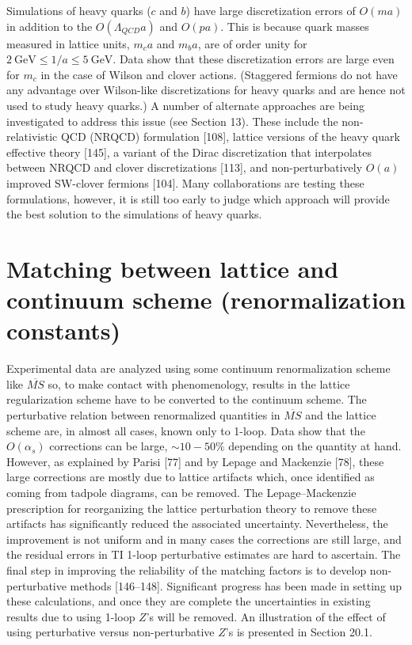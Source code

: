 Simulations of heavy quarks ($c$ and $b$) have large discretization errors of $O(ma)$ in addition to the $O(\Lambda_{QCD}a)$ and $O(pa)$. This is because quark masses measured in lattice units, $m_c a$ and $m_b a$, are of order unity for $2\ \mathrm{GeV} \le 1/a \le 5\ \mathrm{GeV}$. Data show that these discretization errors are large even for $m_c$ in the case of Wilson and clover actions. (Staggered fermions do not have any advantage over Wilson-like discretizations for heavy quarks and are hence not used to study heavy quarks.) A number of alternate approaches are being investigated to address this issue (see Section 13). These include the non-relativistic QCD (NRQCD) formulation [108], lattice versions of the heavy quark effective theory [145], a variant of the Dirac discretization that interpolates between NRQCD and clover discretizations [113], and non-perturbatively $O(a)$ improved SW-clover fermions [104]. Many collaborations are testing these formulations, however, it is still too early to judge which approach will provide the best solution to the simulations of heavy quarks.

\section{Matching between lattice and continuum scheme (renormalization constants)}

Experimental data are analyzed using some continuum renormalization scheme like $\overline{MS}$ so, to make contact with phenomenology, results in the lattice regularization scheme have to be converted to the continuum scheme. The perturbative relation between renormalized quantities in $\overline{MS}$ and the lattice scheme are, in almost all cases, known only to 1-loop. Data show that the $O(\alpha_s)$ corrections can be large, $\sim 10 - 50\%$ depending on the quantity at hand. However, as explained by Parisi [77] and by Lepage and Mackenzie [78], these large corrections are mostly due to lattice artifacts which, once identified as coming from tadpole diagrams, can be removed. The Lepage--Mackenzie prescription for reorganizing the lattice perturbation theory to remove these artifacts has significantly reduced the associated uncertainty. Nevertheless, the improvement is not uniform and in many cases the corrections are still large, and the residual errors in TI 1-loop perturbative estimates are hard to ascertain. The final step in improving the reliability of the matching factors is to develop non-perturbative methods [146--148]. Significant progress has been made in setting up these calculations, and once they are complete the uncertainties in existing results due to using 1-loop $Z$'s will be removed. An illustration of the effect of using perturbative versus non-perturbative $Z$'s is presented in Section 20.1.

